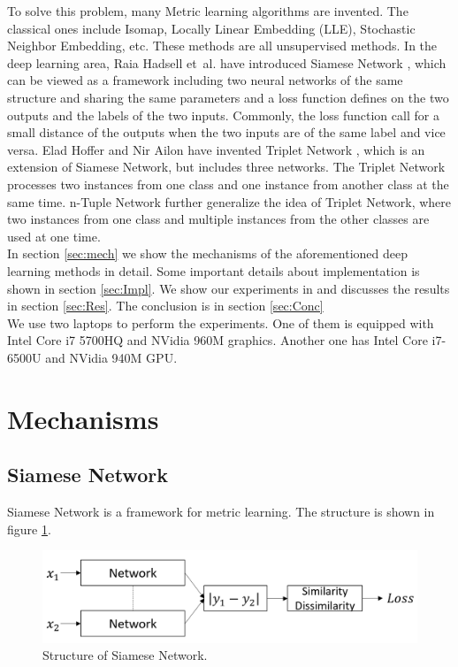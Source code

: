 \documentclass[10pt,twocolumn,letterpaper]{article}
\begin{document}
	To solve this problem, many Metric learning algorithms are invented. The classical ones include Isomap, Locally Linear Embedding (LLE), Stochastic Neighbor Embedding, etc. These methods are all unsupervised methods. In the deep learning area, Raia Hadsell et~al. have introduced Siamese Network \cite{hadsell2006dimensionality}, which can be viewed as a framework including two neural networks of the same structure and sharing the same parameters and a loss function defines on the two outputs and the labels of the two inputs. Commonly, the loss function call for a small distance of the outputs when the two inputs are of the same label and vice versa. Elad Hoffer and Nir Ailon have invented Triplet Network \cite{DBLP:journals/corr/HofferA14}, which is an extension of Siamese Network, but includes three networks. The Triplet Network processes two instances from one class and one instance from another class at the same time. n-Tuple Network \cite{sohn2016improved} further generalize the idea of Triplet Network, where two instances from one class and multiple instances from the other classes are used at one time.\\
	
	In section \ref{sec:mech} we show the mechanisms of the aforementioned deep learning methods in detail. Some important details about implementation is shown in section \ref{sec:Impl}. We show our experiments in and discusses the results in section \ref{sec:Res}. The conclusion is in section \ref{sec:Conc}\\
	
	We use two laptops to perform the experiments. One of them is equipped with Intel Core i7 5700HQ and NVidia 960M graphics. Another one has Intel Core i7-6500U and NVidia 940M GPU.
	
	\section{Mechanisms \label{sec:mech}}
		\subsection{Siamese Network}
			Siamese Network is a framework for metric learning. The structure is shown in figure \ref{fig:siamese_struct}.
			
			\begin{figure}[htbp]
				\begin{center}
					\includegraphics[width=0.9\linewidth]{siamese_struct}
				\end{center}
				\caption{Structure of Siamese Network.\label{fig:siamese_struct}}
			\end{figure}
			
\end{document}
